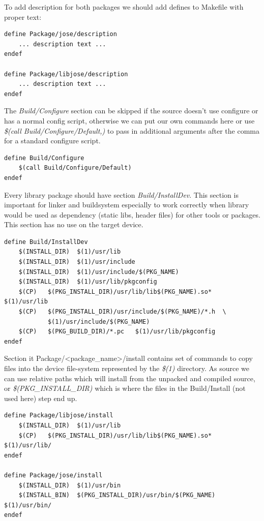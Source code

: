 To add description for both packages we should add defines to Makefile with proper text:
\begin{lstlisting}[columns=fixed,basicstyle=\ttfamily\footnotesize,tabsize=4,backgroundcolor=\color{yellow!10}]
define Package/jose/description
	... description text ...
endef

define Package/libjose/description
	... description text ...
endef
\end{lstlisting}
The {\it Build/Configure} section can be skipped if the source doesn't use configure or has a normal config script, otherwise we can put our own commands here or use {\it \$(call Build/Configure/Default,)} to pass in additional arguments after the comma for a standard configure script.
\begin{lstlisting}[columns=fixed,basicstyle=\ttfamily\footnotesize,tabsize=4,backgroundcolor=\color{yellow!10}]
define Build/Configure
	$(call Build/Configure/Default)
endef
\end{lstlisting}
Every library package should have section {\it Build/InstallDev}.
This section is important for linker and buildsystem especially to work correctly when library would be used as dependency (static libs, header files) for other tools or packages.
This section has no use on the target device.
\begin{lstlisting}[columns=fixed,basicstyle=\ttfamily\footnotesize,tabsize=4,backgroundcolor=\color{yellow!10}]
define Build/InstallDev
	$(INSTALL_DIR)	$(1)/usr/lib
	$(INSTALL_DIR)  $(1)/usr/include
	$(INSTALL_DIR)	$(1)/usr/include/$(PKG_NAME)
	$(INSTALL_DIR)	$(1)/usr/lib/pkgconfig
	$(CP)	$(PKG_INSTALL_DIR)/usr/lib/lib$(PKG_NAME).so*	$(1)/usr/lib
	$(CP)	$(PKG_INSTALL_DIR)/usr/include/$(PKG_NAME)/*.h	\
			$(1)/usr/include/$(PKG_NAME)
	$(CP)	$(PKG_BUILD_DIR)/*.pc	$(1)/usr/lib/pkgconfig
endef
\end{lstlisting}
Section {it Package/<package\_name>/install} contains set of commands to copy files into the device file-system represented by the {\it \$(1)} directory.
As source we can use relative paths which will install from the unpacked and compiled source, or {\it \$(PKG\_INSTALL\_DIR)} which is where the files in the Build/Install (not used here) step end up.
\begin{lstlisting}[columns=fixed,basicstyle=\ttfamily\footnotesize,tabsize=4,backgroundcolor=\color{yellow!10}]
define Package/libjose/install
	$(INSTALL_DIR)	$(1)/usr/lib
	$(CP)	$(PKG_INSTALL_DIR)/usr/lib/lib$(PKG_NAME).so*	$(1)/usr/lib/
endef

define Package/jose/install
	$(INSTALL_DIR)	$(1)/usr/bin
	$(INSTALL_BIN)	$(PKG_INSTALL_DIR)/usr/bin/$(PKG_NAME)	$(1)/usr/bin/
endef
\end{lstlisting}
